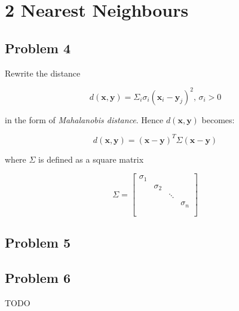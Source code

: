 \section*{2 Nearest Neighbours}

\subsection*{Problem 4}

Rewrite the distance

\[
    d(\mathbf{x}, \mathbf{y}) = 
    \Sigma_i \sigma_i (\mathbf{x}_i - \mathbf{y}_j)^2, \, \sigma_i > 0
\]

in the form of \textit{Mahalanobis distance}. Hence $d(\mathbf{x}, \mathbf{y})$
becomes:

\[
    d(\mathbf{x}, \mathbf{y}) = 
    (\mathbf{x} - \mathbf{y})^T \Sigma (\mathbf{x} - \mathbf{y}) 
\]

where $\Sigma$ is defined as a square matrix

\[
\Sigma =
\left[
    \begin{array}{ccccc}
        \sigma_1\\
        & \sigma_2\\
        &  & \ddots\\
        &  &  & \sigma_n\\
        \\
    \end{array}
\right]
\]

\subsection*{Problem 5} 

\subsection*{Problem 6} 

TODO
